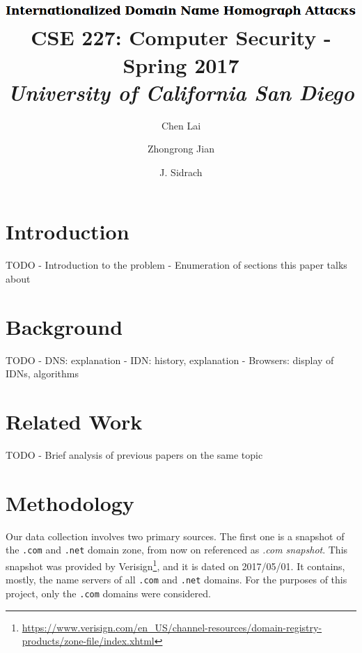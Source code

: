 \documentclass[letterpaper,twocolumn,10pt]{article}
\begin{document}
\date{}

\title{\Large
\includegraphics[height=\baselineskip]{title}
\\ \vspace{0.65mm} \large \normalfont
CSE 227: Computer Security - Spring 2017 \\ \textit{
University of California San Diego
}}

\author{
{\rm Chen Lai}\\
\and
{\rm Zhongrong Jian}\\
\and
{\rm J. Sidrach}\\
}

\maketitle


\section{Introduction}
TODO
- Introduction to the problem
- Enumeration of sections this paper talks about

\section{Background}
TODO
- DNS: explanation
- IDN: history, explanation
- Browsers: display of IDNs, algorithms

\section{Related Work}
TODO
- Brief analysis of previous papers on the same topic

\section{Methodology}
Our data collection involves two primary sources.
The first one is a snapshot of the \texttt{.com} and \texttt{.net} domain zone, from now on referenced as \textit{.com snapshot}.
This snapshot was provided by Verisign\footnote{\url{https://www.verisign.com/en_US/channel-resources/domain-registry-products/zone-file/index.xhtml}}, and it is dated on 2017/05/01.
It contains, mostly, the name servers of all \texttt{.com} and \texttt{.net} domains.
For the purposes of this project, only the \texttt{.com} domains were considered.
\end{document}
